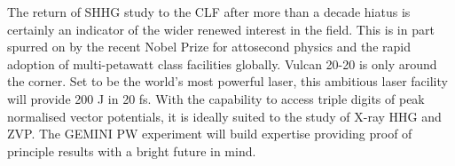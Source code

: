 The return of SHHG study to the CLF after more than a decade hiatus is certainly an indicator of the wider renewed interest in the field. This is in part spurred on by the recent Nobel Prize for attosecond physics and the rapid adoption of multi-petawatt class facilities globally. Vulcan 20-20 is only around the corner. Set to be the world's most powerful laser, this ambitious laser facility will provide 200 J in 20 fs. With the capability to access triple digits of peak normalised vector potentials, it is ideally suited to the study of X-ray HHG and ZVP. The GEMINI PW experiment will build expertise providing proof of principle results with a bright future in mind.
